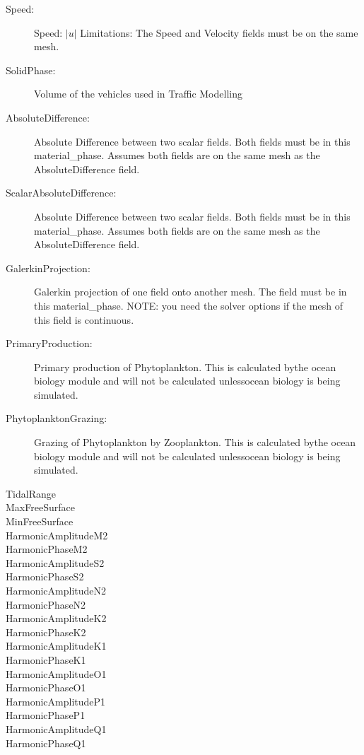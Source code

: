 \begin{description}
\item[Speed:]Speed: $|u|$ 
	Limitations: The Speed and Velocity fields must be on the same mesh.  
\item[SolidPhase:]Volume of the vehicles used in Traffic Modelling  
\item[AbsoluteDifference:]Absolute Difference between two scalar fields. Both fields must be in this material\_phase. Assumes both fields are on the same mesh as the AbsoluteDifference field.  
\item[ScalarAbsoluteDifference:]Absolute Difference between two scalar fields. Both fields must be in this material\_phase. Assumes both fields are on the same mesh as the AbsoluteDifference field.  
\item[GalerkinProjection:]Galerkin projection of one field onto another mesh. The field must be in this material\_phase. 
	NOTE: you need the solver options if the mesh of this field is continuous.  
\item[PrimaryProduction:]Primary production of Phytoplankton. This is calculated bythe ocean biology module and will not be calculated unlessocean biology is being simulated.  
\item[PhytoplanktonGrazing:]Grazing of Phytoplankton by Zooplankton. This is calculated bythe ocean biology module and will not be calculated unlessocean biology is being simulated.  
\item[TidalRange]  
\item[MaxFreeSurface]  
\item[MinFreeSurface]  
\item[HarmonicAmplitudeM2]  
\item[HarmonicPhaseM2]  
\item[HarmonicAmplitudeS2]  
\item[HarmonicPhaseS2]  
\item[HarmonicAmplitudeN2]  
\item[HarmonicPhaseN2]  
\item[HarmonicAmplitudeK2]  
\item[HarmonicPhaseK2]  
\item[HarmonicAmplitudeK1]  
\item[HarmonicPhaseK1]  
\item[HarmonicAmplitudeO1]  
\item[HarmonicPhaseO1]  
\item[HarmonicAmplitudeP1]  
\item[HarmonicPhaseP1]  
\item[HarmonicAmplitudeQ1]  
\item[HarmonicPhaseQ1]  

\end{description}
